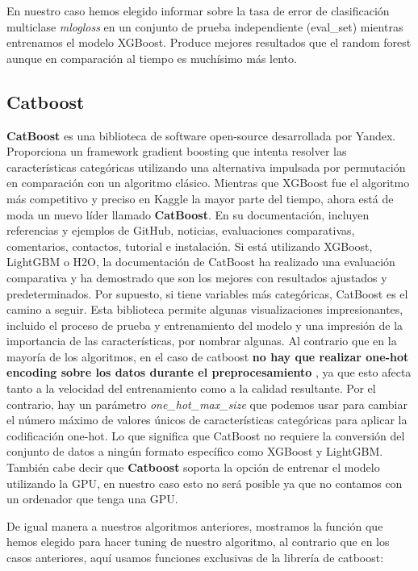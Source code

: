 \documentclass[12pt,twoside]{report}
\begin{document}
En nuestro caso hemos elegido informar sobre la tasa de error de clasificación multiclase \textit{mlogloss} en un conjunto de prueba independiente (eval\_set) mientras entrenamos el modelo XGBoost. Produce mejores resultados que el random forest aunque en comparación al tiempo es muchísimo más lento.

\subsection*{Catboost}

\textbf{CatBoost} \cite{catboost} es una biblioteca de software open-source desarrollada por Yandex. Proporciona un framework gradient boosting que intenta resolver las características categóricas utilizando una alternativa impulsada por permutación en comparación con un algoritmo clásico. Mientras que XGBoost fue el algoritmo más competitivo y preciso en Kaggle la mayor parte del tiempo, ahora está de moda un nuevo líder llamado \textbf{CatBoost}. En su documentación, incluyen referencias y ejemplos de GitHub, noticias, evaluaciones comparativas, comentarios, contactos, tutorial e instalación. Si está utilizando XGBoost, LightGBM o H2O, la documentación de CatBoost ha realizado una evaluación comparativa y ha demostrado que son los mejores con resultados ajustados y predeterminados. Por supuesto, si tiene variables más categóricas, CatBoost es el camino a seguir. Esta biblioteca permite algunas visualizaciones impresionantes, incluido el proceso de prueba y entrenamiento del modelo y una impresión de la importancia de las características, por nombrar algunas. 
Al contrario que en la mayoría de los algoritmos, en el caso de catboost \textbf{no hay que realizar one-hot encoding sobre los datos durante el preprocesamiento} \cite{catboost-onehot}, ya que esto afecta tanto a la velocidad del entrenamiento como a la calidad resultante. Por el contrario, hay un parámetro \textit{one\_hot\_max\_size} que podemos usar para cambiar el número máximo de valores únicos de características categóricas para aplicar la codificación one-hot. Lo que significa que CatBoost no requiere la conversión del conjunto de datos a ningún formato específico como XGBoost y LightGBM. También cabe decir que \textbf{Catboost} soporta la opción de entrenar el modelo utilizando la GPU, en nuestro caso esto no será posible ya que no contamos con un ordenador que tenga una GPU.

De igual manera a nuestros algoritmos anteriores, mostramos la función que hemos elegido para hacer tuning de nuestro algoritmo, al contrario que en los casos anteriores, aquí usamos funciones exclusivas de la librería de catboost:\\
\end{document}
